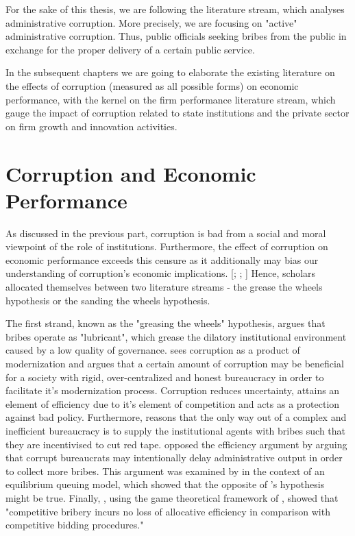 For the sake of this thesis, we are following the literature stream, which analyses administrative corruption. More precisely, we are focusing on "active" administrative corruption. Thus, public officials seeking bribes from the public in exchange for the proper delivery of a certain public service.

In the subsequent chapters we are going to elaborate the existing literature on the effects of corruption (measured as all possible forms) on economic performance, with the kernel on the firm performance literature stream, which gauge the impact of corruption related to state institutions and the private sector on firm growth and innovation activities. 

\section{Corruption and Economic Performance}
As discussed in the previous part, corruption is bad from a social and moral viewpoint of the role of institutions. Furthermore, the effect of corruption on economic performance exceeds this censure as it additionally may bias our understanding of corruption's economic implications. [\citealp[p. 216]{leys1965problem}; \citealp[p. 1]{leff1964economic}; \citealp[p. 4]{meon2005does}]
Hence, scholars allocated themselves between two literature streams - the grease the wheels hypothesis or the sanding the wheels hypothesis. \\ 
\newline
\vspace{0.25cm}{\bf Grease the wheels hypothesis}

The first strand, known as the "greasing the wheels" hypothesis, argues that bribes operate as "lubricant", which grease the dilatory institutional environment caused by a low quality of governance. \citep[p. 4]{meon2005does} \citet[p. 69]{huntington1968political} sees corruption as a product of modernization and argues that a certain amount of corruption may be beneficial for a society with rigid, over-centralized and honest bureaucracy in order to facilitate it's 
modernization process. Corruption reduces uncertainty, attains an element of efficiency due to it's element of competition and acts as a protection against bad policy. \citep[pp. 3--4]{leff1964economic} Furthermore, \citet{leys1965problem} reasons that the only way out of a complex and inefficient bureaucracy is to supply the institutional agents with bribes such that they are incentivised to cut red tape. \citet{myrdal1968teoria} opposed the efficiency argument by arguing that corrupt bureaucrats may intentionally delay administrative output in order to collect more bribes. \citep[p. 761]{lui1985equilibrium} This argument was examined by \citet{lui1985equilibrium} in the context of an equilibrium queuing model, which showed that the opposite of \citeauthor{myrdal1968teoria}'s hypothesis might be true. Finally, \citet[p. 341]{lien1986note},  using the game theoretical framework of \citet{beck1986comparison}, showed that "competitive bribery incurs no loss of allocative efficiency in comparison with competitive bidding procedures." 

